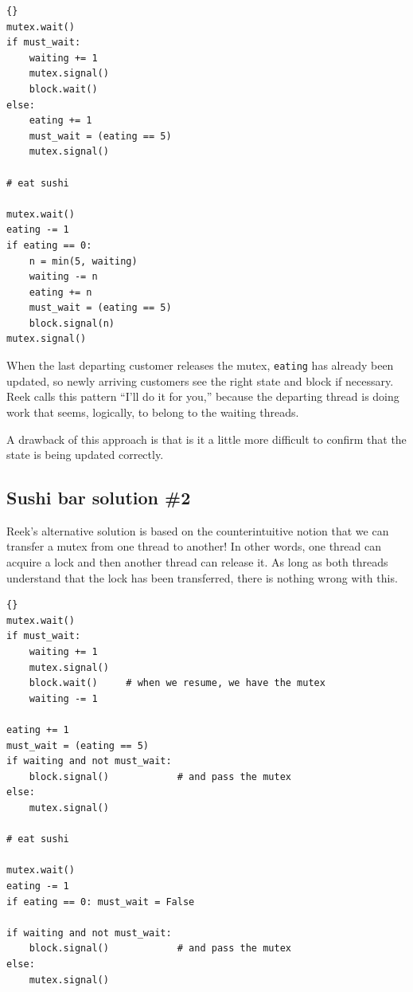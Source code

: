 \documentclass{book}
\newcommand{\clearemptydoublepage}{\newpage\cleardoublepage}
\begin{document}
\begin{latin}
\begin{lstlisting}[title={Sushi bar solution \#1}]{}
mutex.wait()
if must_wait:
    waiting += 1
    mutex.signal()
    block.wait()
else:
    eating += 1
    must_wait = (eating == 5)
    mutex.signal()

# eat sushi

mutex.wait()
eating -= 1
if eating == 0:
    n = min(5, waiting)
    waiting -= n
    eating += n
    must_wait = (eating == 5)
    block.signal(n)
mutex.signal()
\end{lstlisting}
\end{latin}

When the last departing customer releases the mutex, 
{\tt eating} has already been updated, so newly arriving customers
see the right state and block if necessary.  Reek calls this
pattern ``I'll do it for you,'' because the departing thread
is doing work that seems, logically, to belong to the waiting
threads.

A drawback of this approach is that is it a little more difficult
to confirm that the state is being updated correctly.


\clearemptydoublepage
\subsection {Sushi bar solution \#2}

Reek's alternative solution is based on the counterintuitive
notion that we can transfer a mutex from one thread to another!
In other words, one thread can acquire a lock and then another
thread can release it.  As long as both threads understand
that the lock has been transferred, there is nothing wrong with
this.

\begin{latin}
\begin{lstlisting}[title={Sushi bar solution \#2}]{}
mutex.wait()
if must_wait:
    waiting += 1
    mutex.signal()
    block.wait()     # when we resume, we have the mutex
    waiting -= 1

eating += 1
must_wait = (eating == 5)
if waiting and not must_wait:
    block.signal()            # and pass the mutex
else:
    mutex.signal()

# eat sushi

mutex.wait()
eating -= 1
if eating == 0: must_wait = False

if waiting and not must_wait:
    block.signal()            # and pass the mutex
else:
    mutex.signal()
\end{lstlisting}
\end{latin}
\end{document}
